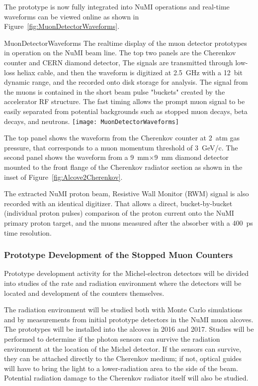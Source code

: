 The prototype is now fully integrated into NuMI operations and
real-time waveforms can be viewed online as shown in
Figure~\ref{fig:MuonDetectorWaveforms}. 
\begin{cdrfigure}{MuonDetectorWaveforms}
{The realtime display of the muon detector prototypes in operation 
on the NuMI beam line. The top two panels are the Cherenkov counter 
and CERN diamond detector\cite{ref:CERNdiamond}, The signals are 
transmitted through low-loss heliax cable, and then the waveform 
is digitized at 2.5~GHz with a 12~bit dynamic range, and the 
recorded onto disk storage for analysis. The signal from the 
muons is contained in the short beam pulse "buckets" created 
by the accelerator RF structure. The fast timing allows the 
prompt muon signal to be easily separated from potential backgrounds 
such as stopped muon decays, beta decays, and neutrons.}
\texttt{[image: MuonDetectorWaveforms]}
\end{cdrfigure}
The top panel shows the waveform from the Cherenkov counter at 2~atm
gas pressure, that corresponds to a muon momentum threshold of
3~GeV/c. The second panel shows the waveform from a 9~mm$\times$9~mm
diamond detector mounted to the front flange of the Cherenkov radiator
section as shown in the inset of Figure~\ref{fig:Alcove2Cherenkov}.

The extracted NuMI proton beam, Resistive Wall Monitor (RWM) signal is
also recorded with an identical digitizer. That allows a direct,
bucket-by-bucket (individual proton pulses) comparison of the proton
current onto the NuMI primary proton target, and the muons measured
after the absorber with a 400~ps time resolution.



\subsubsection{Prototype Development of the Stopped Muon Counters}

Prototype development activity for the Michel-electron detectors will
be divided into studies of the rate and radiation environment where
the detectors will be located and development of the counters
themselves. 

The radiation environment will be studied both with Monte Carlo 
simulations and by measurements from initial prototype detectors 
in the NuMI muon alcoves\cite{ref:NuMIBeamMonitors}.
The prototypes will be installed into the alcoves in 2016 and 2017.
Studies will be performed to determine if the photon sensors
can survive the radiation environment at the location of the Michel
detector. If the sensors can survive, they can be attached directly to
the Cherenkov medium; if not, optical guides will have to bring the
light to a lower-radiation area to the side of the beam. Potential
radiation damage to the Cherenkov radiator itself will also be
studied.


